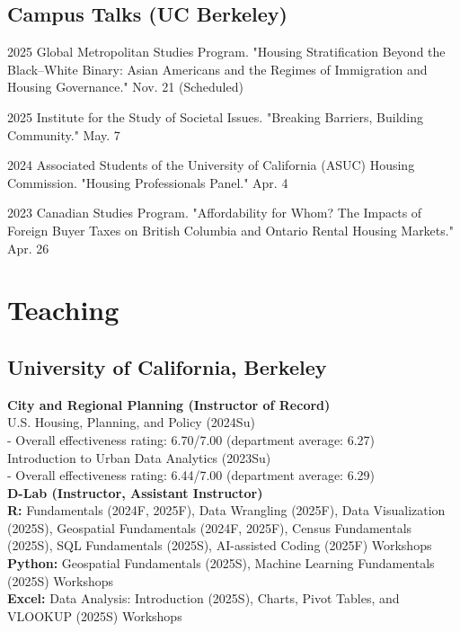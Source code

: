\documentclass[11pt,letterpaper]{report}
\begin{document}
\subsection*{Campus Talks (UC Berkeley)}
\begin{tablist}
\item[2025] \tab{}Global Metropolitan Studies Program. "Housing Stratification Beyond the Black–White Binary: Asian Americans and the Regimes of Immigration and Housing Governance." Nov. 21 (Scheduled)
\item[2025] \tab{}Institute for the Study of Societal Issues. "Breaking Barriers, Building Community." May. 7
\item[2024] \tab{}Associated Students of the University of California (ASUC) Housing Commission. "Housing Professionals Panel." Apr. 4
\item[2023] \tab{}Canadian Studies Program. "Affordability for Whom? The Impacts of Foreign Buyer Taxes on British Columbia and Ontario Rental Housing Markets." Apr. 26
\end{tablist}

\section*{Teaching}
\subsection*{University of California, Berkeley}
\textbf{City and Regional Planning  (Instructor of Record)}\\[0.3em]
U.S. Housing, Planning, and Policy (2024Su)\\
- Overall effectiveness rating: 6.70/7.00 (department average: 6.27)\\[0.3em]
Introduction to Urban Data Analytics (2023Su)\\
- Overall effectiveness rating: 6.44/7.00 (department average: 6.29)\\[0.7em]
\textbf{D-Lab (Instructor, Assistant Instructor)}\\[0.3em]
\textbf{R:} Fundamentals (2024F, 2025F), Data Wrangling (2025F), Data Visualization (2025S), Geospatial Fundamentals (2024F, 2025F), Census Fundamentals (2025S), SQL Fundamentals (2025S), AI-assisted Coding (2025F) Workshops\\[0.3em]
\textbf{Python:} Geospatial Fundamentals (2025S), Machine Learning Fundamentals (2025S) Workshops\\[0.3em]
\textbf{Excel:} Data Analysis: Introduction (2025S), Charts, Pivot Tables, and VLOOKUP (2025S) Workshops
\end{document}
